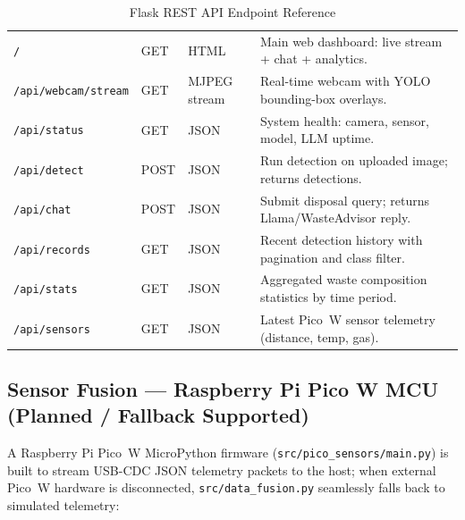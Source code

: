 \documentclass[12pt,a4paper]{article}
\begin{document}
\renewcommand{\arraystretch}{1.30}
\begin{table}[H]
\centering
\caption{Flask REST API Endpoint Reference}
\label{tab:api}
\small
\begin{tabularx}{\linewidth}{@{} L{3.9cm} C{1.5cm} C{2.3cm} X @{}}
\toprule
{} &  &  &  \\
\midrule
{}
{\footnotesize\texttt{/}}                    & GET  & HTML         & Main web dashboard: live stream + chat + analytics. \\
{\footnotesize\texttt{/api/webcam/stream}}   & GET  & MJPEG stream & Real-time webcam with YOLO bounding-box overlays. \\
{\footnotesize\texttt{/api/status}}          & GET  & JSON         & System health: camera, sensor, model, LLM uptime. \\
{\footnotesize\texttt{/api/detect}}          & POST & JSON         & Run detection on uploaded image; returns detections. \\
{\footnotesize\texttt{/api/chat}}            & POST & JSON         & Submit disposal query; returns Llama/WasteAdvisor reply. \\
{\footnotesize\texttt{/api/records}}         & GET  & JSON         & Recent detection history with pagination and class filter. \\
{\footnotesize\texttt{/api/stats}}           & GET  & JSON         & Aggregated waste composition statistics by time period. \\
{\footnotesize\texttt{/api/sensors}}         & GET  & JSON         & Latest Pico~W sensor telemetry (distance, temp, gas). \\
\bottomrule
\end{tabularx}
\end{table}

\subsection{Sensor Fusion --- Raspberry Pi Pico W MCU (Planned / Fallback Supported)}

A Raspberry Pi Pico~W MicroPython firmware (\texttt{src/pico\_sensors/main.py}) is built
to stream USB-CDC JSON telemetry packets to the host; when external Pico~W hardware is
disconnected, \texttt{src/data\_fusion.py} seamlessly falls back to simulated telemetry:
\end{document}
